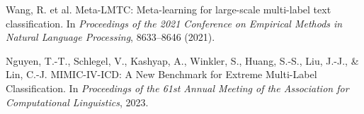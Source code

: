 \documentclass[12pt,a4paper]{report}
\begin{document}
\begin{thebibliography}{99}
Wang, R. et al. Meta-LMTC: Meta-learning for large-scale multi-label text classification. In \textit{Proceedings of the 2021 Conference on Empirical Methods in Natural Language Processing}, 8633–8646 (2021).

Nguyen, T.-T., Schlegel, V., Kashyap, A., Winkler, S., Huang, S.-S., Liu, J.-J., \& Lin, C.-J. MIMIC-IV-ICD: A New Benchmark for Extreme Multi-Label Classification. In \textit{Proceedings of the 61st Annual Meeting of the Association for Computational Linguistics}, 2023.

\end{thebibliography}
\end{document}
